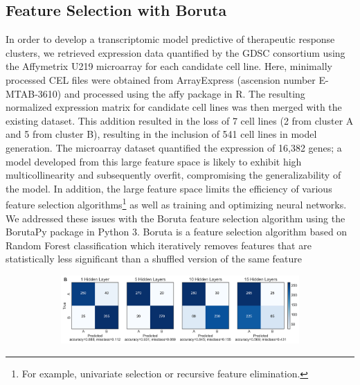 \documentclass[10pt, letterpaper]{article}
\begin{document}
\begin{multicols*}{2}
\subsection{Feature Selection with Boruta}
In order to develop a transcriptomic model predictive of therapeutic response clusters, we retrieved expression data quantified by the GDSC consortium using the Affymetrix U219 microarray for each candidate cell line. Here, minimally processed CEL files were obtained from ArrayExpress (ascension number E-MTAB-3610) and processed using the affy package \cite{affy} in R. The resulting normalized expression matrix for candidate cell lines was then merged with the existing dataset. This addition resulted in the loss of 7 cell lines (2 from cluster A and 5 from cluster B), resulting in the inclusion of 541 cell lines in model generation. The microarray dataset quantified the expression of 16,382 genes; a model developed from this large feature space is likely to exhibit high multicollinearity and subsequently overfit, compromising the generalizability of the model. In addition, the large feature space limits the efficiency of various feature selection algorithms\footnote{For example, univariate selection or recursive feature elimination.} as well as training and optimizing neural networks. We addressed these issues with the Boruta feature selection algorithm using the BorutaPy package \cite{liu} in Python 3. Boruta is a feature selection algorithm based on Random Forest classification which iteratively removes features that are statistically less significant than a shuffled version of the same feature \cite{kursa}


\begin{figure}[!ht]
    \centering
    \begin{subfigure}[t]{\textwidth}
        \centering
        \includegraphics[width=\textwidth]{Figures/confusion_matrix/cm_combined.png}
    \end{subfigure}


\end{figure}
\end{multicols*}
\end{document}
